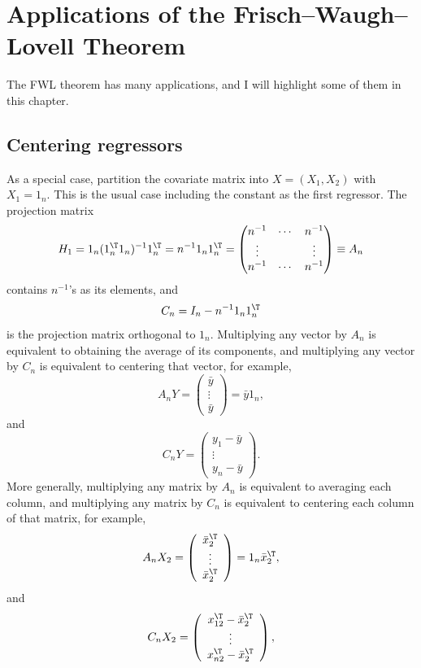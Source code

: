  
\chapter{Applications of the Frisch--Waugh--Lovell Theorem}\label{chapter::FWL-application}
 
The FWL theorem has many applications, and I will highlight some of them in
this chapter. 



\section{Centering regressors}

As a special case, partition the covariate matrix into $X=(X_1,X_2)$ with  $X_{1}=1_{n}$. This is the usual case including the constant as the first regressor.   
The projection matrix 
\[
H_{1}=1_{n}(1_{n}^{\T}1_{n})^{-1}1_{n}^{\T} 
=n^{-1}1_{n}1_{n}^{\T} = \begin{pmatrix}
n^{-1} & \cdots & n^{-1} \\
\vdots && \vdots \\
n^{-1} &\cdots & n^{-1} 
\end{pmatrix} \equiv A_n
\]
 contains $n^{-1}$'s as its elements, and 
 $$
 C_{n}=I_{n}-n^{-1}1_{n}1_{n}^{\T}
 $$
is the projection matrix orthogonal to $1_{n}$. Multiplying any vector by $A_n$ is equivalent to obtaining the average of its components, and multiplying any vector 
by $C_{n}$ is equivalent to centering that vector, for example, 
\[
A_n Y = \left(\begin{array}{c}
 \bar{y}\\
\vdots\\
 \bar{y}
\end{array}\right) =  \bar{y} 1_n ,
\]
and
\[
C_{n}Y=\left(\begin{array}{c}
y_{1}-\bar{y}\\
\vdots\\
y_{n}-\bar{y}
\end{array}\right).
\]
More generally, multiplying any matrix by $A_n$ is equivalent to averaging each column, and multiplying any matrix by $C_{n}$ is equivalent to centering each
column of that matrix, for example,
\[
A_n X_2 = \left(\begin{array}{c}
 \bar{x}_{2}^{\T}\\
\vdots\\
 \bar{x}_{2}^{\T}
\end{array}\right) = 1_n  \bar{x}_{2}^{\T} , 
\]
and
\[
C_{n}X_{2}=\left(\begin{array}{c}
x_{12}^{\T}-\bar{x}_{2}^{\T}\\
\vdots\\
x_{n2}^{\T}-\bar{x}_{2}^{\T}
\end{array}\right),
\]
